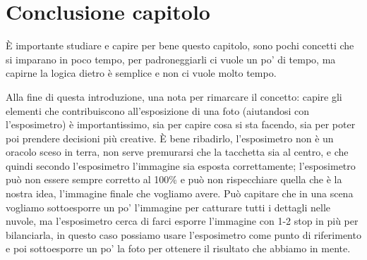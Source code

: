 \section{Conclusione capitolo} \label{sec:conclusione_rudimenti}
È importante studiare e capire per bene questo capitolo, sono pochi concetti che si imparano in poco tempo, per padroneggiarli ci vuole un po' di tempo, ma capirne la logica dietro è semplice e non ci vuole molto tempo.

Alla fine di questa introduzione, una nota per rimarcare il concetto: capire gli elementi che contribuiscono all'esposizione di una foto (aiutandosi con l'esposimetro) è importantissimo, sia per capire cosa si sta facendo, sia per poter poi prendere decisioni più creative.
È bene ribadirlo, l'esposimetro non è un oracolo sceso in terra, non serve premurarsi che la tacchetta sia al centro, e che quindi secondo l'esposimetro l'immagine sia esposta correttamente;
l'esposimetro può non essere sempre corretto al 100\% e può non rispecchiare quella che è la nostra idea, l'immagine finale che vogliamo avere. Può capitare che in una scena vogliamo sottoesporre un po' l'immagine per catturare tutti i dettagli nelle nuvole, ma l'esposimetro cerca di farci esporre l'immagine con 1-2 stop in più per bilanciarla, in questo caso possiamo usare l'esposimetro come punto di riferimento e poi sottoesporre un po' la foto per ottenere il risultato che abbiamo in mente.